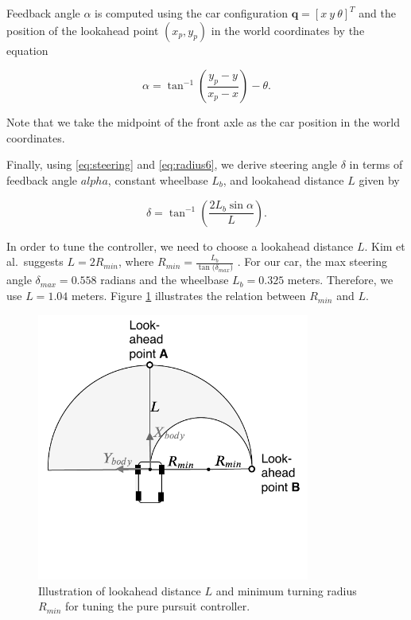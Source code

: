 Feedback angle $\alpha$ is computed using the car configuration $\textbf{q} =
[x\ y\ \theta]^T$ and the position of the lookahead point $(x_p, y_p)$ in the
world coordinates by the equation

\begin{equation}
  \alpha = \tan^{-1}(\frac{y_p - y}{x_p - x}) - \theta.
  \label{eq:alpha}
\end{equation}

Note that we take the midpoint of the front axle as the car position in the
world coordinates.

Finally, using \eqref{eq:steering} and \eqref{eq:radius6},
we derive steering angle $\delta$ in terms of feedback angle $alpha$,
constant wheelbase $L_b$, and lookahead distance $L$ given by

\begin{equation}
  \delta = \tan^{-1}(\frac{2L_b\sin\alpha}{L}).
  \label{eq:delta}
\end{equation}

In order to tune the controller, we need to choose a lookahead distance $L$.
Kim et al.\ suggests $L = 2R_{min}$, where $R_{min} =
\frac{L_b}{\tan({\delta_{max})}}$ \cite{Kim2013SensorbasedMP}. For our car, the
max steering angle $\delta_{max} = 0.558$ radians and the wheelbase $L_b =
0.325$ meters. Therefore, we use $L = 1.04$ meters. Figure
\ref{figure:lookahead} illustrates the relation between $R_{min}$ and $L$.

\begin{figure}[h]
  \centering
  \includegraphics[width=0.8\textwidth]{figures/pure-pursuit-lookahead.pdf}
  \caption[Pure pursuit controller tuning]{Illustration of lookahead distance
  $L$ and minimum turning radius $R_{min}$ for tuning the pure pursuit
  controller.}
  \label{figure:lookahead}
\end{figure}

